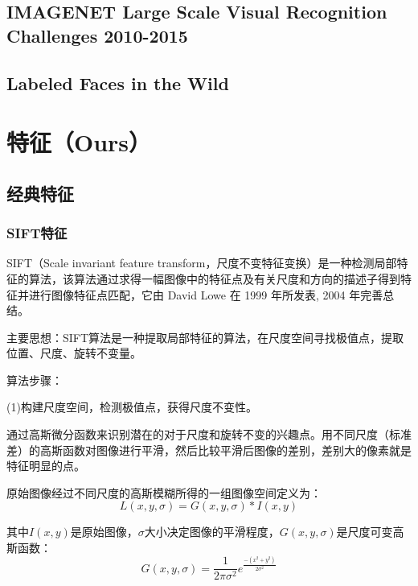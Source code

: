 \documentclass[12pt]{article}
\begin{document}
\subsection{IMAGENET Large Scale Visual Recognition Challenges 2010-2015}

\subsection{Labeled Faces in the Wild}

\section{特征（Ours）}

\subsection{经典特征}

\subsubsection{SIFT特征}

SIFT（Scale invariant feature transform，尺度不变特征变换）是一种检测局部特征的算法，该算法通过求得一幅图像中的特征点及有关尺度和方向的描述子得到特征并进行图像特征点匹配，它由 David Lowe 在 1999 年\cite{lowe1999object}所发表, 2004 年\cite{lowe2004distinctive}完善总结。%

{\color{blue}主要思想}：SIFT算法是一种提取局部特征的算法，在尺度空间寻找极值点，提取位置、尺度、旋转不变量。

{\color{blue}算法步骤}：

(1)构建尺度空间，检测极值点，获得尺度不变性。
    
    通过高斯微分函数来识别潜在的对于尺度和旋转不变的兴趣点。用不同尺度（标准差）的高斯函数对图像进行平滑，然后比较平滑后图像的差别，差别大的像素就是特征明显的点。
    
    原始图像经过不同尺度的高斯模糊所得的一组图像空间定义为：
    \begin{displaymath}
        L(x,y,\sigma)=G(x,y,\sigma)*I(x,y)
    \end{displaymath}
    
    其中$I(x,y)$是原始图像，$\sigma$大小决定图像的平滑程度，$G(x,y,\sigma)$是尺度可变高斯函数：
    \begin{displaymath}
        G(x,y,\sigma)=\frac{1}{2\pi \sigma^{2}}e^{\frac{-(x^{2}+y^{2})}{2\sigma^{2}}}
    \end{displaymath}
    
\end{document}
